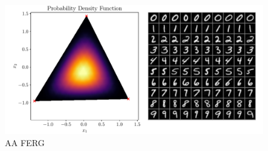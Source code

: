 \begin{figure}[htpb]
    \centering
    \includegraphics[width=1\linewidth]{figures/samples/aa_emnist.pdf}
    \caption{AA FERG}%
    \label{fig:aa_emnist}
\end{figure}


